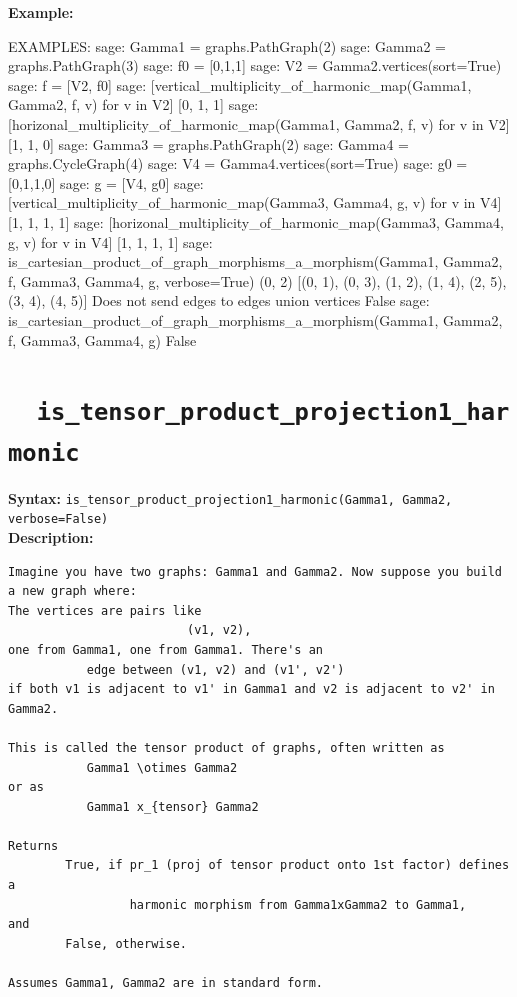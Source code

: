 \documentclass{article}
\begin{document}
\textbf{Example:}
\begin{spverbatim}
EXAMPLES:
    sage: Gamma1 = graphs.PathGraph(2)
    sage: Gamma2 = graphs.PathGraph(3)
    sage: f0 = [0,1,1]       
    sage: V2 = Gamma2.vertices(sort=True) 
    sage: f = [V2, f0]     
    sage: [vertical_multiplicity_of_harmonic_map(Gamma1, Gamma2, f, v) for v in V2] 
    [0, 1, 1]
    sage: [horizonal_multiplicity_of_harmonic_map(Gamma1, Gamma2, f, v) for v in V2]
    [1, 1, 0]
    sage: Gamma3 = graphs.PathGraph(2) 
    sage: Gamma4 = graphs.CycleGraph(4) 
    sage: V4 = Gamma4.vertices(sort=True) 
    sage: g0 = [0,1,1,0]     
    sage: g = [V4, g0]  
    sage: [vertical_multiplicity_of_harmonic_map(Gamma3, Gamma4, g, v) for v in V4] 
    [1, 1, 1, 1]
    sage: [horizonal_multiplicity_of_harmonic_map(Gamma3, Gamma4, g, v) for v in V4]  
    [1, 1, 1, 1]
    sage: is_cartesian_product_of_graph_morphisms_a_morphism(Gamma1, Gamma2, f, Gamma3, Gamma4, g, verbose=True)  
    (0, 2) [(0, 1), (0, 3), (1, 2), (1, 4), (2, 5), (3, 4), (4, 5)]
    Does not send edges to {edges} union {vertices}
    False
    sage: is_cartesian_product_of_graph_morphisms_a_morphism(Gamma1, Gamma2, f, Gamma3, Gamma4, g) 
    False
\end{spverbatim}

\section{\tt \ \ is\_tensor\_product\_projection1\_harmonic}

\textbf{Syntax:} \verb}is_tensor_product_projection1_harmonic(Gamma1, Gamma2, verbose=False)}\\

\textbf{Description:}
\begin{verbatim}
Imagine you have two graphs: Gamma1 and Gamma2. Now suppose you build a new graph where:
The vertices are pairs like 
                         (v1, v2),
one from Gamma1, one from Gamma1. There's an 
           edge between (v1, v2) and (v1', v2') 
if both v1 is adjacent to v1' in Gamma1 and v2 is adjacent to v2' in Gamma2.

This is called the tensor product of graphs, often written as 
           Gamma1 \otimes Gamma2
or as 
           Gamma1 x_{tensor} Gamma2

Returns 
        True, if pr_1 (proj of tensor product onto 1st factor) defines a 
                 harmonic morphism from Gamma1xGamma2 to Gamma1, 
and 
        False, otherwise. 

Assumes Gamma1, Gamma2 are in standard form.
\end{verbatim}
\end{document}
